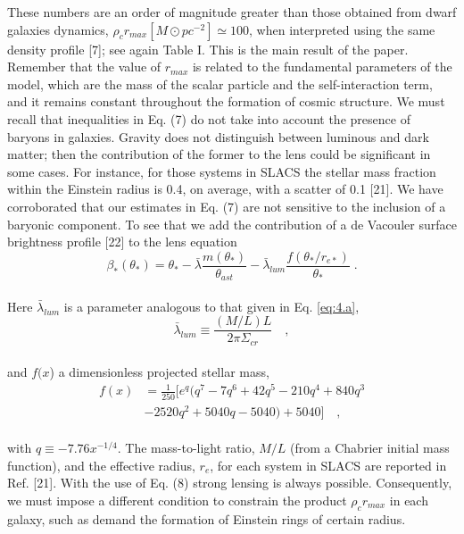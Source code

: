 \documentclass[letterpaper,10pt]{article}
\begin{document}
\begin{multicols}{2}
{These numbers are an order of magnitude greater than those obtained from dwarf galaxies dynamics, $\rho_c r_{max}[M\odot pc^{-2}] \simeq 100$, when interpreted using the same density profile [7]; see again Table I. This is the main result of the paper. Remember that the value of $r_{max}$ is related to the fundamental parameters of the model, which are the mass of the scalar particle and the self-interaction term, and it remains constant throughout the formation of cosmic structure. We must recall that inequalities in Eq. (7) do not take into account the presence of baryons in galaxies. Gravity does not distinguish between luminous and dark matter; then the contribution of the former to the lens could be significant in some cases. For instance, for those systems in SLACS the stellar mass fraction within the Einstein radius is 0.4, on average, with a scatter of 0.1 [21].
We have corroborated that our estimates in Eq. (7) are not sensitive to the inclusion of a baryonic component. To see that we add the contribution of a de Vacouler
surface brightness profile [22] to the lens equation
\begin{equation}
\tag{8a}
\label{eq:8a}
\beta_{\ast}(\theta_{\ast})=\theta_{\ast} - \bar{\lambda}\frac{m(\theta_{\ast})}{\theta_{ast}} - \bar{\lambda}_{lum} \frac{f(\theta_{\ast}/r_{e \ast})}{\theta_{\ast}} \; .
\end{equation}
\\
Here $\bar{\lambda}_{lum}$ is a parameter analogous to that given in Eq. \eqref{eq:4.a},
\begin{equation}
\tag{8b}
\label{eq:8b}
\bar{\lambda}_{lum} \equiv \frac{(M/L)L}{2\pi \Sigma_{cr}} \quad ,
\end{equation}
\\
and $f(x$) a dimensionless projected stellar mass,
\begin{equation}
\tag{8c}
\begin{split}
\label{eq:8c}
f (x) & =  \frac{1}{250} [e^q(q^7-7q^6+42q^5-210q^4+840q^3 \\
& -2520q^2+5040q-5040)+5040]  \quad ,
\end{split}
\end{equation}
\\
with $q \equiv -7.76 x^{-1/4} $. The mass-to-light ratio, $M/L$ (from a Chabrier initial mass function), and the effective radius, $r_e$, for each system in SLACS are reported in Ref. [21]. With the use of Eq. (8) strong lensing is always possible. Consequently, we must impose a different condition to constrain the product  $\rho_{c}r_{max}$ in each galaxy, such as demand the formation of Einstein rings of certain radius.\\
}
\end{multicols}
\end{document}
